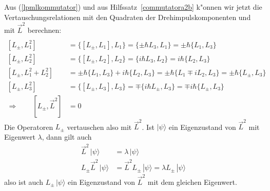 Aus (\ref{lpmlkommutator}) und aus
Hilfssatz~\ref{commutatora2b} k"onnen wir jetzt die
Vertauschungsrelationen mit den Quadraten der Drehimpulskomponenten
und mit $\vec L^2$ berechnen:
\begin{align*}
\\
[L_\pm,L_1^2]
&=
\{ [L_\pm, L_1], L_1 \}
=
\{ \pm \hbar L_3, L_1 \}
=
\pm \hbar \{ L_1, L_3 \}
\\
[L_\pm,L_2^2]
&=
\{ [L_\pm, L_2], L_2 \}
=
\{ i\hbar L_3, L_2 \}
=
i\hbar \{ L_2, L_3 \}
\\
[L_\pm,L_1^2 + L_2^2]
&=
\pm \hbar \{ L_1, L_3 \}
+
i\hbar \{ L_2, L_3 \}
=
\pm \hbar \{ L_1 \mp iL_2, L_3 \}
=
\pm \hbar\{L_\pm, L_3\}
\\
[L_\pm,L_3^2]
&=
\{ [L_\pm, L_3], L_3 \}
=
\mp \{ i\hbar L_\pm, L_3 \}
=
\mp i\hbar \{ L_\pm, L_3 \}
\\
\Rightarrow\qquad [L_\pm,\vec L^2]
&=0
\end{align*}
Die Operatoren $L_\pm$ vertauschen also mit $\vec L^2$.
Ist $|\psi\rangle$ ein Eigenzustand von $\vec L^2$ mit Eigenwert $\lambda$,
dann gilt auch 
\begin{align*}
\vec L^2\,|\psi\rangle&=\lambda\,|\psi\rangle
\\
L_\pm\vec L^2\,|\psi\rangle&=
\vec L^2L_\pm\,|\psi\rangle=
\lambda L_\pm\,|\psi\rangle
\end{align*}
also ist  auch $L_\pm\,|\psi\rangle$ ein Eigenzustand von $\vec L^2$ mit
dem gleichen Eigenwert.

%
